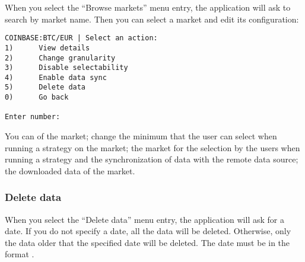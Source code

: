When you select the ``Browse markets'' menu entry, the application will ask to
search by market name. Then you can select a market and edit its configuration:

\begin{verbatim}
COINBASE:BTC/EUR | Select an action:
1)      View details
2)      Change granularity
3)      Disable selectability
4)      Enable data sync
5)      Delete data
0)      Go back

Enter number:
\end{verbatim}

You can  of the market; change the minimum
 that the user can select when running a strategy on the
market;  the market for the selection by the users
when running a strategy and the synchronization of data with the remote data
source;  the downloaded data of the market.

\subsubsection{Delete data}

When you select the ``Delete data'' menu entry, the application will ask for a
date. If you do not specify a date, all the data will be deleted. Otherwise,
only the data older that the specified date will be deleted. The date must be in
the format  .
